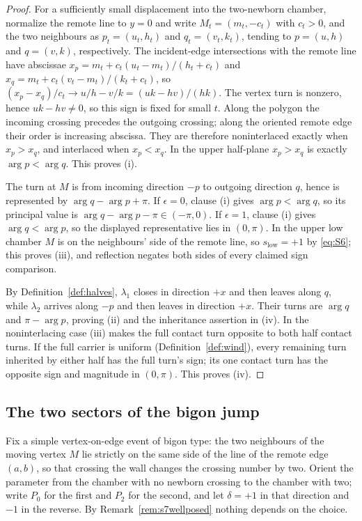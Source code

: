 \begin{proof}
For a sufficiently small displacement into the two-newborn chamber, normalize the
remote line to $y=0$ and write
$M_t=(m_t,-c_t)$ with $c_t>0$, and the two neighbours as
$p_t=(u_t,h_t)$ and $q_t=(v_t,k_t)$, tending to $p=(u,h)$ and $q=(v,k)$,
respectively. The incident-edge intersections with the remote line have abscissae
$x_p=m_t+c_t(u_t-m_t)/(h_t+c_t)$ and
$x_q=m_t+c_t(v_t-m_t)/(k_t+c_t)$, so
$(x_p-x_q)/c_t\longrightarrow u/h-v/k=(uk-hv)/(hk)$.
The vertex turn is nonzero, hence $uk-hv\neq0$, so this sign is fixed for small
$t$. Along the polygon the incoming crossing precedes the outgoing crossing;
along the oriented remote edge their order is increasing abscissa. They are
therefore noninterlaced exactly when $x_p>x_q$, and interlaced when $x_p<x_q$.
In the upper half-plane $x_p>x_q$ is exactly $\arg p<\arg q$. This proves (i).

The turn at $M$ is from incoming direction $-p$ to outgoing direction $q$,
hence is represented by $\arg q-\arg p+\pi$. If $\epsilon=0$, clause (i)
gives $\arg p<\arg q$, so its principal value is
$\arg q-\arg p-\pi\in(-\pi,0)$. If $\epsilon=1$, clause (i) gives
$\arg q<\arg p$, so the displayed representative lies in $(0,\pi)$.
In the upper low chamber $M$ is on the neighbours' side of the remote line,
so $s_{\mathrm{low}}=+1$ by \eqref{eq:S6}; this proves (iii),
and reflection negates both sides of every claimed sign comparison.

By Definition~\ref{def:halves}, $\lambda_1$ closes in direction $+x$ and
then leaves along $q$, while $\lambda_2$ arrives along $-p$ and then leaves
in direction $+x$. Their turns are $\arg q$ and $\pi-\arg p$, proving (ii)
and the inheritance assertion in (iv). In the noninterlacing case (iii)
makes the full contact turn opposite to both half contact turns. If the full
carrier is uniform (Definition~\ref{def:wind}), every remaining turn inherited by
either half has the full turn's sign; its one contact turn has the opposite
sign and magnitude in $(0,\pi)$. This proves (iv).
\end{proof}

\subsection{The two sectors of the bigon jump}\label{sec:sectors}

Fix a simple vertex-on-edge event of bigon type: the two neighbours of the
moving vertex $M$ lie strictly on the same side of the line of the remote edge
$(a,b)$, so that crossing the wall changes the crossing number by two. Orient
the parameter from the chamber with no newborn crossing to the chamber with
two; write $P_0$ for the first and $P_2$ for the second, and let
$\delta=+1$ in that direction and $-1$ in the reverse. By
Remark~\ref{rem:s7wellposed} nothing depends on the choice.


